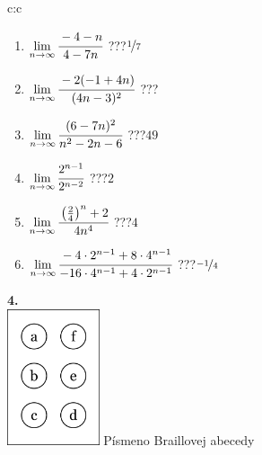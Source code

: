 \documentclass[10pt]{report}
\begin{document}
\begin{tabular}{c:c}
\begin{minipage}[c][104.5mm][t]{0.5\linewidth}
\begin{center}
\begin{minipage}{0.79\linewidth}
\begin{center}
\begin{varwidth}{\linewidth}
\begin{enumerate}
\normalsize
\item $\lim\limits_{n\to\infty}\cfrac{-4-n}{4-7n}$\quad \dotfill\; ???\;\dotfill \quad $\nicefrac{1}{7}$
\item $\lim\limits_{n\to\infty}\cfrac{-2(-1+4n)}{(4n-3)^2}$\quad \dotfill\; ???\;\dotfill {}
\item $\lim\limits_{n\to\infty}\cfrac{(6-7n)^2}{n^2-2n-6}$\quad \dotfill\; ???\;\dotfill \quad $49$
\item $\lim\limits_{n\to\infty}\cfrac{2^{n-1}}{2^{n-2}}$\quad \dotfill\; ???\;\dotfill \quad $2$
\item $\lim\limits_{n\to\infty}\cfrac{\left(\frac{2}{4}\right)^n +2}{4n^{4}}$\quad \dotfill\; ???\;\dotfill \quad $4$
\item $\lim\limits_{n\to\infty}\cfrac{-4\cdot 2^{n-1}+8\cdot 4^{n-1}}{-16\cdot 4^{n-1}+4\cdot 2^{n-1}}$\quad \dotfill\; ???\;\dotfill \quad $\nicefrac{-1}{4}$
\end{enumerate}
\end{varwidth}
\end{center}
\end{minipage}
\begin{minipage}{0.20\linewidth}
\begin{center}
{\Huge\bfseries 4.} \\[2mm]
\includegraphics[height=40mm]{../images/braille.png}
{\small Písmeno Braillovej abecedy}
\end{center}
\end{minipage}
\end{center}
\end{minipage}
%
\end{tabular}
\newpage
\end{document}
